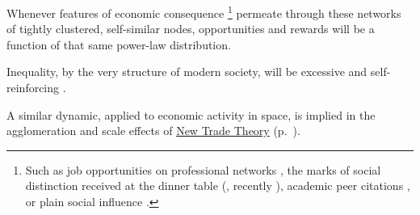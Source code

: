 \begin{enumerate}
	Whenever features of economic consequence
	\footnote{
		Such as job opportunities on professional networks \citep{Benkler2006}, the marks of social distinction received at the dinner table (\citealt{Bourdieu-1984-aa}, recently \citealt{Hartmann2002}), academic peer citations \citep{Jackson1968, Merton1988}, or plain social influence \citep{Asch}.
	}
	permeate through these networks of tightly clustered, self-similar nodes, opportunities and rewards will be a function of that same power-law distribution.

	Inequality, by the very structure of modern society, will be excessive and self-reinforcing \citep{Cozzi2009,Keller2005,Andriani2007}.

	A similar dynamic, applied to economic activity in space, is implied in the agglomeration and scale effects of \hyperref[sec:NTT]{New Trade Theory} (p.~\pageref{sec:NTT}).
\end{enumerate}





